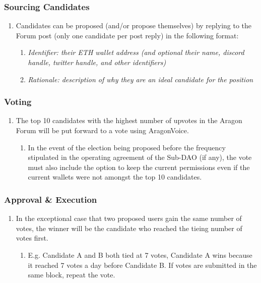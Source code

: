 \subsubsection*{Sourcing Candidates}

\begin{enumerate}
	\item Candidates can be proposed (and/or propose themselves) by replying to the Forum post (only one candidate per post reply) in the following format:
	\begin{enumerate}
		\item \textit{Identifier: their ETH wallet address (and optional their name, discord handle, twitter handle, and other identifiers)}
		\item \textit{Rationale: description of why they are an ideal candidate for the position}
	\end{enumerate}
\end{enumerate}


\subsubsection*{Voting}
\begin{enumerate}
	\item The top 10 candidates with the highest number of upvotes in the Aragon Forum will be put forward to a vote using \gls{AragonVoice}.
	\begin{enumerate}
		\item In the event of the election being proposed before the frequency stipulated in the operating agreement of the Sub-\ac{DAO} (if any), the vote must also include the option to keep the current permissions even if the current wallets were not amongst the top 10 candidates.
	\end{enumerate}
\end{enumerate}

\subsubsection*{Approval \& Execution}
\begin{enumerate}
	\item In the exceptional case that two proposed users gain the same number of votes, the winner will be the candidate who reached the tieing number of votes first.
	\begin{enumerate}
		\item E.g. Candidate A and B both tied at 7 votes, Candidate A wins because it reached 7 votes a day before Candidate B.
		If votes are submitted in the same block, repeat the vote.
	\end{enumerate}

\end{enumerate}


